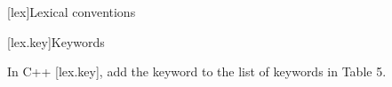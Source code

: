 
[lex]{Lexical conventions}

\setcounter{section}{10}
[lex.key]{Keywords}

\pnum
In C++ [lex.key], add the keyword  to the list of
keywords in Table 5.
